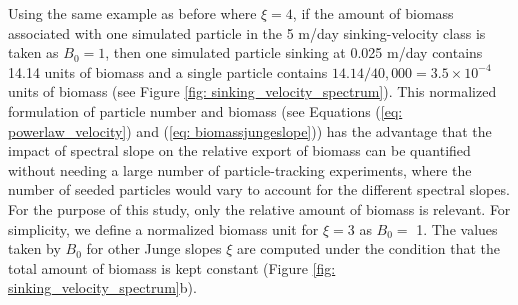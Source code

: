 \documentclass[article,linenumbers]{agujournal2019}
\begin{document}
	Using the same example as before where $\xi = 4$, if the amount of biomass associated with one simulated particle in the 5 m/day sinking-velocity class is taken as $B_0 = 1$, then one simulated particle sinking at 0.025 m/day contains 14.14 units of biomass and a single particle contains $14.14/40,000 =3.5\times10^{-4}$ units of biomass (see Figure \ref{fig: sinking_velocity_spectrum}). This normalized formulation of particle number and biomass (see Equations (\ref{eq: powerlaw_velocity}) and (\ref{eq: biomassjungeslope})) has the advantage that the impact of spectral slope on the relative export of biomass can be quantified without needing a large number of particle-tracking experiments, where the number of seeded particles would vary to account for the different spectral slopes. For the purpose of this study, only the relative amount of biomass is relevant. For simplicity, we define a normalized biomass unit for $\xi =3$ as $B_0=$ 1. The values taken by $B_0$ for other Junge slopes $\xi$ are computed under the condition that the total amount of biomass is kept constant (Figure \ref{fig: sinking_velocity_spectrum}b).
\end{document}
